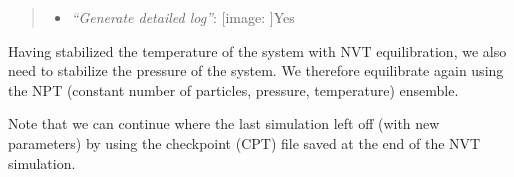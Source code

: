 \documentclass[twocolumn]{bmcart}%
\def\texttt{[image: ]}
\providecommand{\tightlist}{%
  \setlength{\itemsep}{0pt}\setlength{\parskip}{0pt}}
\begin{document}
\begin{quote}
\begin{enumerate}
\begin{itemize}
\begin{itemize}
      \begin{itemize}
      \tightlist
      \item
        \emph{``Bond constraints (constraints)''}:
        \texttt{All\ bonds\ (all-bonds).}
      \item
        \emph{``Temperature /K''}: \texttt{300}
      \item
        \emph{``Step length in ps''}: \texttt{0.0002}
      \item
        \emph{``Number of steps that elapse between saving data points
        (velocities, forces, energies)''}: \texttt{1000}
      \item
        \emph{``Number of steps for the simulation''}: \texttt{50000}
      \end{itemize}
    \end{itemize}
  \item
    \emph{``Generate detailed log''}: \texttt{Yes}
  \end{itemize}
\end{enumerate}


\end{quote}

Having stabilized the temperature of the system with NVT equilibration,
we also need to stabilize the pressure of the system. We therefore
equilibrate again using the NPT (constant number of particles, pressure,
temperature) ensemble.

Note that we can continue where the last simulation left off (with new
parameters) by using the checkpoint (CPT) file saved at the end of the
NVT simulation.
\end{document}
